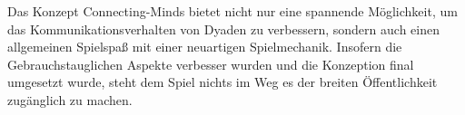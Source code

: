 Das Konzept Connecting-Minds bietet nicht nur eine spannende Möglichkeit, um das Kommunikationsverhalten von Dyaden zu verbessern, sondern auch einen allgemeinen Spielspaß mit einer neuartigen Spielmechanik. Insofern die Gebrauchstauglichen Aspekte verbesser wurden und die Konzeption final umgesetzt wurde, steht dem Spiel nichts im Weg es der breiten Öffentlichkeit zugänglich zu machen.